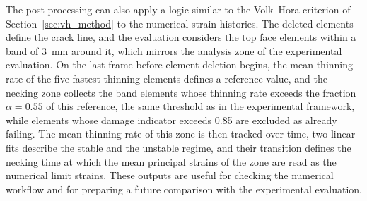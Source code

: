 The post-processing can also apply a logic similar to the Volk--Hora criterion
of Section~\ref{sec:vh_method} to the numerical strain histories. The deleted
elements define the crack line, and the evaluation considers the top face
elements within a band of \SI{3}{\milli\meter} around it, which mirrors the
analysis zone of the experimental evaluation. On the last frame before element
deletion begins, the mean thinning rate of the five fastest thinning elements
defines a reference value, and the necking zone collects the band elements
whose thinning rate exceeds the fraction $\alpha=0.55$ of this reference, the
same threshold as in the experimental framework, while elements whose damage
indicator exceeds \num{0.85} are excluded as already failing. The mean
thinning rate of this zone is then tracked over time, two linear fits describe
the stable and the unstable regime, and their transition defines the necking
time at which the mean principal strains of the zone are read as the numerical
limit strains. These outputs are useful for checking the numerical workflow
and for preparing a future comparison with the experimental evaluation.
